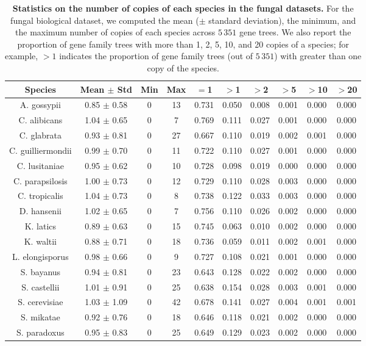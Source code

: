 \begin{table}[!h]
\centering
\setlength{\tabcolsep}{6pt}
\caption{{\bf Statistics on the number of copies of each species in the fungal datasets.} 
For the fungal biological dataset, we computed the mean ($\pm$ standard deviation), the minimum, and the maximum number of copies of each species across $5\,351$ gene trees.
We also report the proportion of gene family trees with more than 1, 2, 5, 10, and 20 copies of a species; for example, $>1$ indicates the proportion of gene family trees (out of $5\,351$) with greater than one copy of the species.
}\label{tab:fungi-biological}
\begin{tabular}{ccccc ccccc}
\toprule
Species & Mean $\pm$ Std & Min & Max & $=$1 & $>$1 & $>$2 & $>$5 & $>$10 & $>$20\\
\midrule
 A. gossypii & 0.85 $\pm$ 0.58 & 0 & 13 & 0.731 & 0.050 & 0.008 & 0.001 & 0.000 & 0.000\\
 C. alibicans & 1.04 $\pm$ 0.65 & 0 & 7 & 0.769 & 0.111 & 0.027 & 0.001 & 0.000 & 0.000\\
 C. glabrata & 0.93 $\pm$ 0.81 & 0 & 27 & 0.667 & 0.110 & 0.019 & 0.002 & 0.001 & 0.000\\
 C. guilliermondii & 0.99 $\pm$ 0.70 & 0 & 11 & 0.722 & 0.110 & 0.027 & 0.001 & 0.000 & 0.000\\
 C. lusitaniae & 0.95 $\pm$ 0.62 & 0 & 10 & 0.728 & 0.098 & 0.019 & 0.000 & 0.000 & 0.000\\
 C. parapsilosis & 1.00 $\pm$ 0.73 & 0 & 12 & 0.729 & 0.110 & 0.028 & 0.003 & 0.000 & 0.000\\
 C. tropicalis & 1.04 $\pm$ 0.73 & 0 & 8 & 0.738 & 0.122 & 0.033 & 0.003 & 0.000 & 0.000\\
 D. hansenii & 1.02 $\pm$ 0.65 & 0 & 7 & 0.756 & 0.110 & 0.026 & 0.002 & 0.000 & 0.000\\
 K. latics & 0.89 $\pm$ 0.63 & 0 & 15 & 0.745 & 0.063 & 0.010 & 0.002 & 0.000 & 0.000\\
 K. waltii & 0.88 $\pm$ 0.71 & 0 & 18 & 0.736 & 0.059 & 0.011 & 0.002 & 0.001 & 0.000\\
 L. elongisporus & 0.98 $\pm$ 0.66 & 0 & 9 & 0.727 & 0.108 & 0.021 & 0.001 & 0.000 & 0.000\\
 S. bayanus & 0.94 $\pm$ 0.81 & 0 & 23 & 0.643 & 0.128 & 0.022 & 0.002 & 0.000 & 0.000\\
 S. castellii & 1.01 $\pm$ 0.91 & 0 & 25 & 0.638 & 0.154 & 0.028 & 0.003 & 0.001 & 0.000\\
 S. cerevisiae & 1.03 $\pm$ 1.09 & 0 & 42 & 0.678 & 0.141 & 0.027 & 0.004 & 0.001 & 0.001\\
 S. mikatae & 0.92 $\pm$ 0.76 & 0 & 18 & 0.646 & 0.118 & 0.021 & 0.002 & 0.000 & 0.000\\
 S. paradoxus & 0.95 $\pm$ 0.83 & 0 & 25 & 0.649 & 0.129 & 0.023 & 0.002 & 0.000 & 0.000\\
\bottomrule
\end{tabular}
\end{table}

